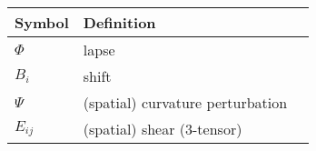 
\begin{tabular}{lll}
 \toprule
  Symbol & Definition \\
 \midrule
 \midrule
 \(\Phi\) & lapse \\
 \(B_i\) & shift \\
 \(\Psi\) & (spatial) curvature perturbation  \\
 \(E_{ij}\) & (spatial) shear (3-tensor) \\
 \bottomrule
\end{tabular}
